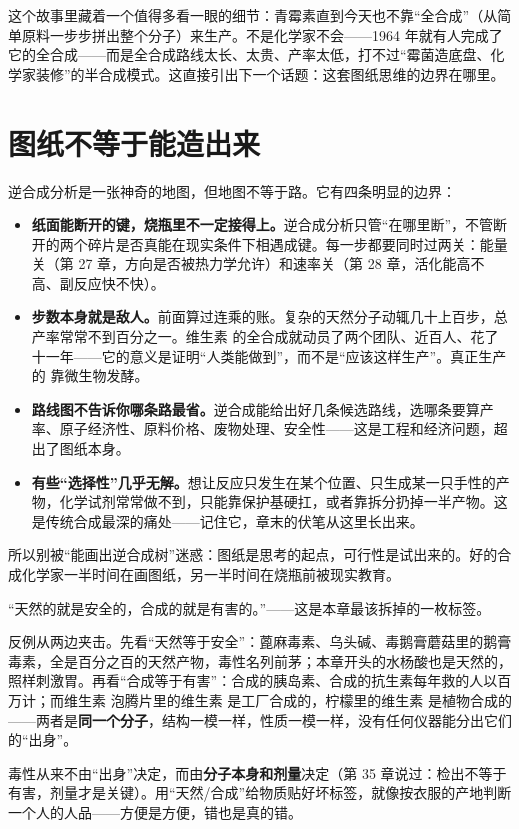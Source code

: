 这个故事里藏着一个值得多看一眼的细节：青霉素直到今天也不靠“全合成”（从简单原料一步步拼出整个分子）来生产。不是化学家不会——1964 年就有人完成了它的全合成——而是全合成路线太长、太贵、产率太低，打不过“霉菌造底盘、化学家装修”的半合成模式。这直接引出下一个话题：这套图纸思维的边界在哪里。

\section{图纸不等于能造出来}

逆合成分析是一张神奇的地图，但地图不等于路。它有四条明显的边界：

\begin{itemize}[itemsep=2pt]
\item \textbf{纸面能断开的键，烧瓶里不一定接得上。}逆合成分析只管“在哪里断”，不管断开的两个碎片是否真能在现实条件下相遇成键。每一步都要同时过两关：能量关（第 27 章，方向是否被热力学允许）和速率关（第 28 章，活化能高不高、副反应快不快）。
\item \textbf{步数本身就是敌人。}前面算过连乘的账。复杂的天然分子动辄几十上百步，总产率常常不到百分之一。维生素  的全合成就动员了两个团队、近百人、花了十一年——它的意义是证明“人类能做到”，而不是“应该这样生产”。真正生产的  靠微生物发酵。
\item \textbf{路线图不告诉你哪条路最省。}逆合成能给出好几条候选路线，选哪条要算产率、原子经济性、原料价格、废物处理、安全性——这是工程和经济问题，超出了图纸本身。
\item \textbf{有些“选择性”几乎无解。}想让反应只发生在某个位置、只生成某一只手性的产物，化学试剂常常做不到，只能靠保护基硬扛，或者靠拆分扔掉一半产物。这是传统合成最深的痛处——记住它，章末的伏笔从这里长出来。
\end{itemize}

所以别被“能画出逆合成树”迷惑：图纸是思考的起点，可行性是试出来的。好的合成化学家一半时间在画图纸，另一半时间在烧瓶前被现实教育。

\begin{wuqu}
“天然的就是安全的，合成的就是有害的。”——这是本章最该拆掉的一枚标签。

反例从两边夹击。先看“天然等于安全”：蓖麻毒素、乌头碱、毒鹅膏蘑菇里的鹅膏毒素，全是百分之百的天然产物，毒性名列前茅；本章开头的水杨酸也是天然的，照样刺激胃。再看“合成等于有害”：合成的胰岛素、合成的抗生素每年救的人以百万计；而维生素  泡腾片里的维生素  是工厂合成的，柠檬里的维生素  是植物合成的——两者是\textbf{同一个分子}，结构一模一样，性质一模一样，没有任何仪器能分出它们的“出身”。

毒性从来不由“出身”决定，而由\textbf{分子本身和剂量}决定（第 35 章说过：检出不等于有害，剂量才是关键）。用“天然/合成”给物质贴好坏标签，就像按衣服的产地判断一个人的人品——方便是方便，错也是真的错。
\end{wuqu}

